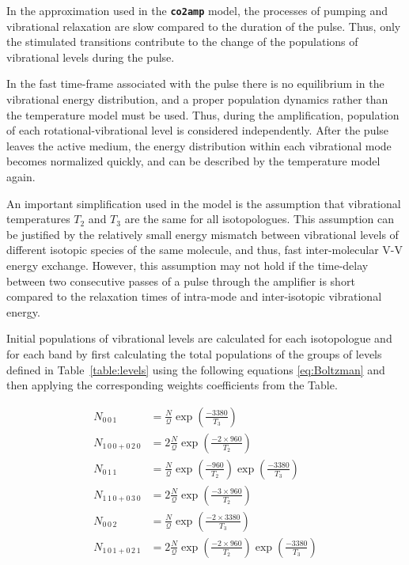 In the approximation used in the \textbf{\texttt{co2amp}} model, the processes of pumping and vibrational relaxation are slow compared to the duration of the pulse. Thus, only the stimulated transitions contribute to the change of the populations of vibrational levels during the pulse.

In the fast time-frame associated with the pulse there is no equilibrium in the vibrational energy distribution, and a proper population dynamics rather than the temperature model must be used. Thus, during the amplification, population of each rotational-vibrational level is considered independently. After the pulse leaves the active medium, the energy distribution within each vibrational mode becomes normalized quickly, and can be described by the temperature model again.

An important simplification used in the model is the assumption that vibrational temperatures $T_2$ and $T_3$ are the same for all  isotopologues. This assumption can be justified by the relatively small energy mismatch between vibrational levels of different isotopic species of the same molecule, and thus, fast inter-molecular V-V energy exchange. However, this assumption may not hold if the time-delay between two consecutive passes of a pulse through the amplifier is short compared to the relaxation times of intra-mode and inter-isotopic vibrational energy.


Initial populations of vibrational levels are calculated for each isotopologue and for each band by first calculating the total populations of the groups of levels defined in Table~\ref{table:levels} using the following equations \ref{eq:Boltzman} and then applying the corresponding weights coefficients from the Table.

\begin{equation}\label{eq:Boltzman}
\begin{aligned}
N_{0\,0\,1}           &=   \frac{N}{\mathcal{Q}} \exp\left(\frac{-3380}{T_3}\right)\\
N_{1\,0\,0 + 0\,2\,0} &= 2 \frac{N}{\mathcal{Q}} \exp\left(\frac{-2\times 960}{T_2}\right)\\
N_{0\,1\,1}           &=   \frac{N}{\mathcal{Q}} \exp\left(\frac{-960}{T_2}\right) \exp\left(\frac{-3380}{T_3}\right)\\
N_{1\,1\,0 + 0\,3\,0} &= 2 \frac{N}{\mathcal{Q}} \exp\left(\frac{-3\times 960}{T_2}\right)\\
N_{0\,0\,2}           &=   \frac{N}{\mathcal{Q}} \exp\left(\frac{-2\times 3380}{T_3}\right)\\
N_{1\,0\,1 + 0\,2\,1} &= 2 \frac{N}{\mathcal{Q}} \exp\left(\frac{-2\times 960}{T_2}\right) \exp\left(\frac{-3380}{T_3}\right)
\end{aligned}
\end{equation}

